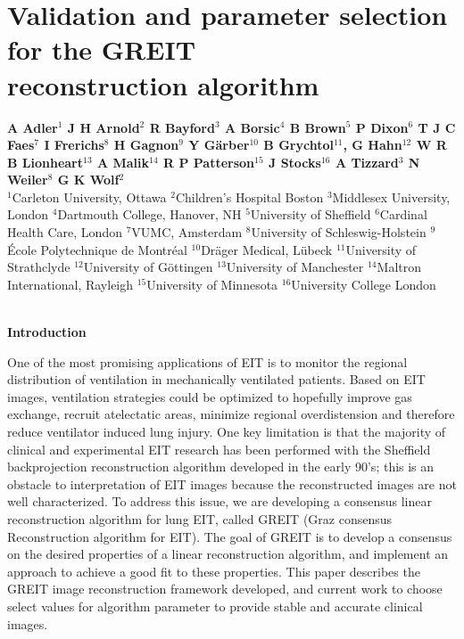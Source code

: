 \documentclass[12pt]{article}
\newcommand{\mysection}[1]{
~\\ \noindent
{\bf \normalsize #1}
\vspace{1mm}
}
\begin{document}
\renewcommand\refname{}


\section*{%
Validation and parameter selection for
the GREIT \\ reconstruction algorithm
}

\vspace{-2mm}
\begin{list}{}{\setlength\leftmargin{25mm}}
\item[]\raggedright
 \footnotesize
{\bf
        A Adler$^{1}$
        J H Arnold$^{2}$
        R Bayford$^{3}$
        A Borsic$^{4}$
        B Brown$^{5}$
        P Dixon$^{6}$
        T J C Faes$^{7}$
        I Frerichs$^{8}$
        H Gagnon$^{9}$
        Y G\"arber$^{10}$
        B Grychtol$^{11}$, 
        G Hahn$^{12}$
        W R B Lionheart$^{13}$
        A Malik$^{14}$
        R P Patterson$^{15}$
        J Stocks$^{16}$
        A Tizzard$^{3}$
        N Weiler$^{8}$
        G K Wolf$^{2}$
}
\\
          $^{1}$Carleton University, Ottawa
          $^{2}$Children's Hospital Boston
          $^{3}$Middlesex University, London
          $^{4}$Dartmouth College, Hanover, NH
          $^{5}$University of Sheffield
          $^{6}$Cardinal Health Care, London
          $^{7}$VUMC, Amsterdam
          $^{8}$University of Schleswig-Holstein
          $^{9}$\'Ecole Polytechnique de Montr\'eal
         $^{10}$Dr\"ager Medical, L\"ubeck
         $^{11}$University of Strathclyde
         $^{12}$University of G\"ottingen
         $^{13}$University of Manchester
         $^{14}$Maltron International, Rayleigh
         $^{15}$University of Minnesota
         $^{16}$University College London
\end{list}

\vspace{-5mm}
\small
\mysection{Introduction}

One of the most promising applications of EIT is to monitor the
regional distribution of ventilation in mechanically
ventilated patients.
Based on EIT images, ventilation strategies could be
optimized to hopefully improve gas exchange, recruit
atelectatic areas, minimize regional overdistension and
therefore reduce ventilator induced lung injury.
One key limitation is that
the majority of clinical and experimental EIT research
has been performed with the Sheffield backprojection
reconstruction algorithm developed in the early 90's; this
is an obstacle to interpretation of EIT images because
the reconstructed images are not well characterized. To
address this issue, we are developing a consensus linear
reconstruction algorithm for lung EIT, called GREIT (Graz
consensus Reconstruction algorithm for EIT).  The goal of
GREIT is to develop a consensus on the desired properties
of a linear reconstruction algorithm, and implement an
approach to achieve a good fit to these properties.
This paper describes the GREIT image reconstruction
framework developed, and
current work to choose select values for
algorithm parameter to provide stable and 
accurate clinical images.
\end{document}
